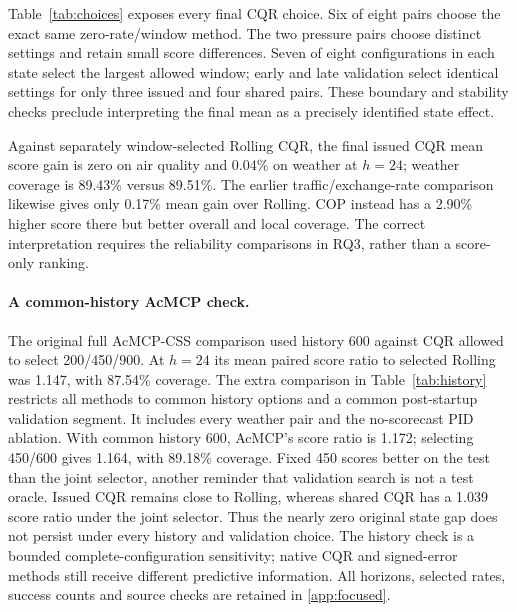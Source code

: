 Table~\ref{tab:choices} exposes every final CQR choice. Six of eight pairs choose
the exact same zero-rate/window method. The two pressure pairs choose distinct
settings and retain small score differences. Seven of eight configurations in each
state select the largest allowed window; early and late validation select identical
settings for only three issued and four shared pairs. These boundary and stability
checks preclude interpreting the final mean as a precisely identified state effect.

\begin{table}[!htbp]\centering\scriptsize
\caption{Every final CQR pair at $h=24$, original full-validation selector. S/I
are shared/issued; C2 and Bolt are the two Chronos models. IS is in the respective
series' units. Same rolling means both rates are zero with the same window.
Air A/D denote Aotizhongxin/Dingling.}
\label{tab:choices}\end{table}

Against separately window-selected Rolling CQR, the final issued CQR mean score
gain is zero on air quality and 0.04\% on weather at $h=24$; weather coverage is
89.43\% versus 89.51\%. The earlier traffic/exchange-rate comparison likewise
gives only 0.17\% mean gain over Rolling. COP instead has a 2.90\% higher score
there but better overall and local coverage. The correct interpretation requires
the reliability comparisons in RQ3, rather than a score-only ranking.

\paragraph{A common-history AcMCP check.}
The original full AcMCP-CSS comparison used history 600 against CQR allowed to
select 200/450/900. At $h=24$ its mean paired score ratio to selected Rolling was
1.147, with 87.54\% coverage. The extra comparison in Table~\ref{tab:history}
restricts all methods to common history options and a common post-startup validation
segment. It includes every weather pair and the no-scorecast PID ablation.
With common history 600, AcMCP's score ratio is 1.172; selecting 450/600 gives
1.164, with 89.18\% coverage. Fixed 450 scores better on the test than the joint
selector, another reminder that validation search is not a test oracle. Issued
CQR remains close to Rolling, whereas shared CQR has a 1.039 score ratio under
the joint selector. Thus the nearly zero original state gap does not persist
under every history and validation choice.
The history check is a bounded complete-configuration sensitivity; native CQR and
signed-error methods still receive different predictive information. All horizons,
selected rates, success counts and source checks are retained in \ref{app:focused}.

